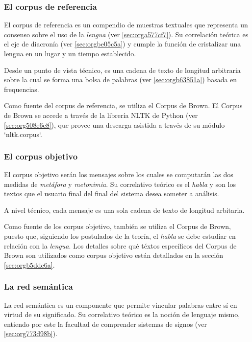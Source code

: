 \documentclass[12pt,letterpaper,twoside]{article}
\begin{document}
\subsubsection{El corpus de referencia}
\label{sec:org73ea622}

El corpus de referencia es un compendio de muestras textuales que
representa un consenso sobre el uso de la \emph{lengua}
(ver \ref{sec:orga577cf7}). Su correlación teórica es el eje de diacronía (ver
\ref{sec:orgbe05c5a}) y cumple la función de cristalizar una
lengua en un lugar y un tiempo establecido.

Desde un punto de vista técnico, es una cadena de texto de
longitud arbitraria sobre la cual se forma una bolsa de palabras
(ver \ref{sec:orgb63851a}) basada en frequencias.

Como fuente del corpus de referencia, se utiliza el Corpus de
Brown. El Corpus de Brown se accede a través de la librería NLTK
de Python (ver \ref{sec:org508e6e8}), que provee una descarga asistida a través
de su módulo `nltk.corpus`.


\subsubsection{El corpus objetivo}
\label{sec:org075e9a6}

El corpus objetivo serán los mensajes sobre los cuales se
computarán las dos medidas de \emph{metáfora} y \emph{metonimia}.  Su
correlativo teórico es el \emph{habla} y son los textos que el usuario
final del final del sistema desea someter a análisis.

A nivel técnico, cada mensaje es una sola cadena de texto de
longitud arbitaria.

Como fuente de los corpus objetivo, también se utiliza el Corpus
de Brown, puesto que, siguiendo los postulados de la teoría, el
\emph{habla} se debe estudiar en relación con la \emph{lengua}. Los
detalles sobre qué téxtos específicos del Corpus de Brown son
utilizados como corpus objetivo están detallados en la sección
\ref{sec:orgb5ddc6a}.



\subsubsection{La red semántica}
\label{sec:org71009f3}

La red semántica es un componente que permite vincular palabras
entre sí en virtud de su significado. Su correlativo teórico
es la noción de lenguaje mismo, entiendo por este la facultad
de comprender sistemas de signos (ver \ref{sec:org773d98b}).
\end{document}
